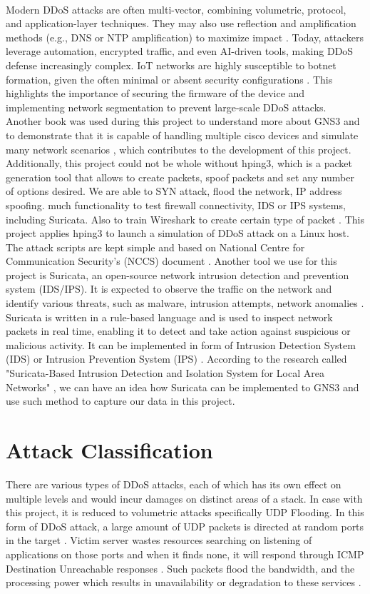 \\
Modern DDoS attacks are often multi-vector, combining volumetric, protocol, and application-layer techniques. They may also use reflection and amplification methods (e.g., DNS or NTP amplification) to maximize impact \cite{nikolskaya2017review}. Today, attackers leverage automation, encrypted traffic, and even AI-driven tools, making DDoS defense increasingly complex. IoT networks are highly susceptible to botnet formation, given the often minimal or absent security configurations \cite{long2001trends}. This highlights the importance of securing the firmware of the device and implementing network segmentation to prevent large-scale DDoS attacks. Another book was used during this project to understand more about GNS3 and to demonstrate that it is capable of handling multiple cisco devices and simulate many network scenarios \cite{welsh2013gns3}, which contributes to the development of this project.
\\
Additionally, this project could not be whole without hping3, which is a packet generation tool that allows to create packets, spoof packets and set any number of options desired. We are able to SYN attack, flood the network, IP address spoofing. much functionality to test firewall connectivity, IDS or IPS systems, including Suricata. Also to train Wireshark to create certain type of packet \cite{miller2022cissp}. This project applies hping3 to launch a simulation of DDoS attack on a Linux host. The attack scripts are kept simple and based on National Centre for Communication Security's (NCCS) document \cite{nccs}. Another tool we use for this project is Suricata, an open-source network intrusion detection and prevention system (IDS/IPS). It is expected to observe the traffic on the network and identify various threats, such as malware, intrusion attempts, network anomalies \cite{fadhilah2020performance}. Suricata is written in a rule-based language and is used to inspect network packets in real time, enabling it to detect and take action against suspicious or malicious activity. It can be implemented in form of Intrusion Detection System (IDS) or Intrusion Prevention System (IPS) \cite{gupta2024security}. According to the research called "Suricata-Based Intrusion Detection and Isolation System for Local Area Networks" \cite{sree2024suricata}, we can have an idea how Suricata can be implemented to GNS3 and use such method to capture our data in this project.
\section{Attack Classification}
There are various types of DDoS attacks, each of which has its own effect on multiple levels and would incur damages on distinct areas of a stack. In case with this project, it is reduced to volumetric attacks specifically UDP Flooding. In this form of DDoS attack, a large amount of UDP packets is directed at random ports in the target \cite{g2016network1}. Victim server wastes resources searching on listening of applications on those ports and when it finds none, it will respond through ICMP Destination Unreachable responses \cite{inproceedings}. Such packets flood the bandwidth, and the processing power which results in unavailability or degradation to these services \cite{JAVANMARDI2024103778}.
